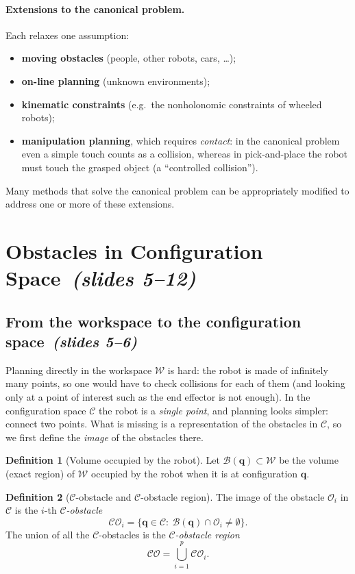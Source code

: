 \documentclass[11pt,a4paper]{article}
\newcommand{\Cspace}{\mathcal{C}}
\newcommand{\Wspace}{\mathcal{W}}
\newcommand{\CO}{\mathcal{CO}}
\newcommand{\Obs}{\mathcal{O}}
\newcommand{\Rob}{\mathcal{B}}
\newcommand{\vq}{\boldsymbol{q}}
\newcommand{\slides}[1]{\emph{(slides #1)}}
\newcommand{\sect}[2]{\section{#1\texorpdfstring{\ \slides{#2}}{ (slides #2)}}}
\newcommand{\subsect}[2]{\subsection{#1\texorpdfstring{\ \slides{#2}}{ (slides #2)}}}
\theoremstyle{definition}
\newtheorem{definition}{Definition}[section]
\theoremstyle{plain}
\theoremstyle{remark}
\begin{document}
\paragraph{Extensions to the canonical problem.} Each relaxes one assumption:
\begin{itemize}
  \item \textbf{moving obstacles} (people, other robots, cars, \dots);
  \item \textbf{on-line planning} (unknown environments);
  \item \textbf{kinematic constraints} (e.g.\ the nonholonomic constraints of wheeled robots);
  \item \textbf{manipulation planning}, which requires \emph{contact}: in the canonical problem even a simple touch counts as a collision, whereas in pick-and-place the robot must touch the grasped object (a ``controlled collision'').
\end{itemize}
Many methods that solve the canonical problem can be appropriately modified to address one or more of these extensions.

\sect{Obstacles in Configuration Space}{5--12}

\subsect{From the workspace to the configuration space}{5--6}

Planning directly in the workspace $\Wspace$ is hard: the robot is made of infinitely many points, so one would have to check collisions for each of them (and looking only at a point of interest such as the end effector is not enough). In the configuration space $\Cspace$ the robot is a \emph{single point}, and planning looks simpler: connect two points. What is missing is a representation of the obstacles in $\Cspace$, so we first define the \emph{image} of the obstacles there.

\begin{definition}[Volume occupied by the robot]
Let $\Rob(\vq)\subset\Wspace$ be the volume (exact region) of $\Wspace$ occupied by the robot when it is at configuration $\vq$.
\end{definition}

\begin{definition}[$\Cspace$-obstacle and $\Cspace$-obstacle region]
The image of the obstacle $\Obs_i$ in $\Cspace$ is the $i$-th \emph{$\Cspace$-obstacle}
\[
  \CO_i=\{\vq\in\Cspace:\ \Rob(\vq)\cap\Obs_i\neq\emptyset\}.
\]
The union of all the $\Cspace$-obstacles is the \emph{$\Cspace$-obstacle region}
\[
  \CO=\bigcup_{i=1}^{p}\CO_i .
\]
\end{definition}
\end{document}

